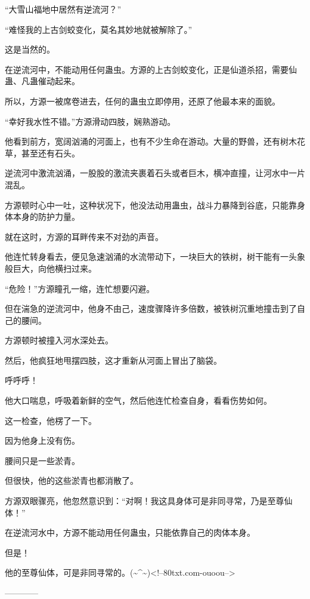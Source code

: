 \begin{this_body}
“大雪山福地中居然有逆流河？”

“难怪我的上古剑蛟变化，莫名其妙地就被解除了。”

这是当然的。

在逆流河中，不能动用任何蛊虫。方源的上古剑蛟变化，正是仙道杀招，需要仙蛊、凡蛊催动起来。

所以，方源一被席卷进去，任何的蛊虫立即停用，还原了他最本来的面貌。

“幸好我水性不错。”方源滑动四肢，娴熟游动。

他看到前方，宽阔汹涌的河面上，也有不少生命在游动。大量的野兽，还有树木花草，甚至还有石头。

逆流河中激流汹涌，一股股的激流夹裹着石头或者巨木，横冲直撞，让河水中一片混乱。

方源顿时心中一吐，这种状况下，他没法动用蛊虫，战斗力暴降到谷底，只能靠身体本身的防护力量。

就在这时，方源的耳畔传来不对劲的声音。

他连忙转身看去，便见急速汹涌的水流带动下，一块巨大的铁树，树干能有一头象般巨大，向他横扫过来。

“危险！”方源瞳孔一缩，连忙想要闪避。

但在湍急的逆流河中，他身不由己，速度骤降许多倍数，被铁树沉重地撞击到了自己的腰间。

方源顿时被撞入河水深处去。

然后，他疯狂地甩摆四肢，这才重新从河面上冒出了脑袋。

呼呼呼！

他大口喘息，呼吸着新鲜的空气，然后他连忙检查自身，看看伤势如何。

这一检查，他楞了一下。

因为他身上没有伤。

腰间只是一些淤青。

但很快，他的这些淤青也都消散了。

方源双眼骤亮，他忽然意识到：“对啊！我这具身体可是非同寻常，乃是至尊仙体！”

在逆流河水中，方源不能动用任何蛊虫，只能依靠自己的肉体本身。

但是！

他的至尊仙体，可是非同寻常的。(\~{}\^{}\~{})<!--80txt.com-ouoou-->

------------

\end{this_body}

